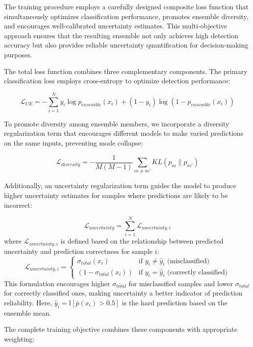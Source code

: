 \documentclass[journal]{IEEEtran}
\begin{document}
The training procedure employs a carefully designed composite loss function that simultaneously optimizes classification performance, promotes ensemble diversity, and encourages well-calibrated uncertainty estimates. This multi-objective approach ensures that the resulting ensemble not only achieves high detection accuracy but also provides reliable uncertainty quantification for decision-making purposes.

The total loss function combines three complementary components. The primary classification loss employs cross-entropy to optimize detection performance:

\begin{equation}
\mathcal{L}_{CE} = -\sum_{i=1}^N y_i \log p_{ensemble}(x_i) + (1-y_i) \log(1-p_{ensemble}(x_i))
\end{equation}

To promote diversity among ensemble members, we incorporate a diversity regularization term that encourages different models to make varied predictions on the same inputs, preventing mode collapse:

\begin{equation}
\mathcal{L}_{diversity} = -\frac{1}{M(M-1)} \sum_{m \neq m'} KL(p_m \| p_{m'})
\end{equation}

Additionally, an uncertainty regularization term guides the model to produce higher uncertainty estimates for samples where predictions are likely to be incorrect:

\begin{equation}
\mathcal{L}_{uncertainty} = \sum_{i=1}^N \mathcal{L}_{uncertainty,i}
\end{equation}
where $\mathcal{L}_{uncertainty,i}$ is defined based on the relationship between predicted uncertainty and prediction correctness for sample $i$:
$$ \mathcal{L}_{uncertainty,i} = \begin{cases} \sigma_{total}(x_i) & \text{if } y_i \neq \hat{y}_i \text{ (misclassified)} \\ (1 - \sigma_{total}(x_i)) & \text{if } y_i = \hat{y}_i \text{ (correctly classified)} \end{cases} $$
This formulation encourages higher $\sigma_{total}$ for misclassified samples and lower $\sigma_{total}$ for correctly classified ones, making uncertainty a better indicator of prediction reliability. Here, $\hat{y}_i = \mathbb{I}[\bar{p}(x_i) > 0.5]$ is the hard prediction based on the ensemble mean.

The complete training objective combines these components with appropriate weighting:
\end{document}
